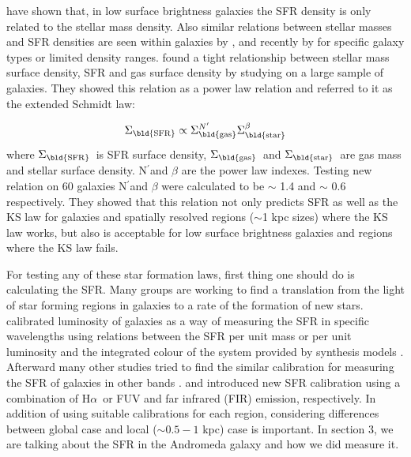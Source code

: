 \documentclass[useAMS,usenatbib]{mn2e}
\newcommand \sigmagas    {$\Sigma_{\rm \bld {gas }}$\ }
\newcommand \eqsigmagas    {\Sigma_{\rm \bld {gas }}}
\newcommand \sigmasfr     {$\Sigma_{\rm \bld {SFR }}$\ }
\newcommand \eqsigmasfr     {\Sigma_{\rm \bld {SFR }}}
\newcommand \sigmastar    {$\Sigma_{\rm \bld {star }}$\ }
\newcommand \eqsigmastar    {\Sigma_{\rm \bld {star }}}
\newcommand \halpha    {H$\alpha $\ }
\newcommand \nprime {N$^\prime$}
\newcommand \eqnprime {N^\prime}
\begin{document}
\cite{Hunter98} have shown that, in low surface brightness galaxies the SFR density is only related to the stellar mass density. Also similar relations between stellar masses and SFR densities are seen within galaxies by \cite{Ryder94}, \cite{Hunter04} and recently by \cite{Leroy08} for specific galaxy types or limited density ranges. \cite{Shi11} found a tight relationship between stellar mass surface density, SFR and gas surface density by studying on a large sample of galaxies. They showed this relation as a power law relation and referred to it as the extended Schmidt law:

\begin{equation}
\eqsigmasfr \propto \eqsigmagas^{\eqnprime} \eqsigmastar^{\beta}
\end{equation}
where \sigmasfr is SFR surface density, \sigmagas and \sigmastar are gas mass and stellar surface density. \nprime and $\beta$ are the power law indexes. Testing new relation on 60 galaxies \nprime and $\beta$ were calculated to be $\sim$ 1.4 and $\sim$ 0.6 respectively. They showed that this relation not only predicts SFR as well as the KS law for galaxies and spatially resolved regions ($\sim$1 kpc sizes) where the KS law works, but also is acceptable for low surface brightness galaxies and regions where the KS law fails.

For testing any of these star formation laws, first thing one should do is calculating the SFR. Many groups are working to find a translation from the light of star forming regions in galaxies to a rate of the formation of new stars. \cite{Kennicutt98b} calibrated luminosity of galaxies as a way of measuring the SFR in specific wavelengths using relations between the SFR per unit mass or per unit luminosity and the integrated colour of the system provided by synthesis models  \citep[e.g.,][]{Bruzual93}. Afterward many other studies tried to find the similar calibration for measuring the SFR of galaxies in other bands \citep[e.g.,][]{Kennicutt12, Calzetti12, Zhu08, Kennicutt09, Boquien10, Boquien11, Hao11}. \cite{Kennicutt09} and \cite{Hao11} introduced new SFR calibration using a combination of \halpha or FUV and far infrared (FIR) emission, respectively. In addition of using suitable calibrations for each region, considering differences between global case and local ($\sim 0.5-1$ kpc) case is important. In section 3, we are talking about the SFR in the Andromeda galaxy and how we did measure it.
\end{document}
